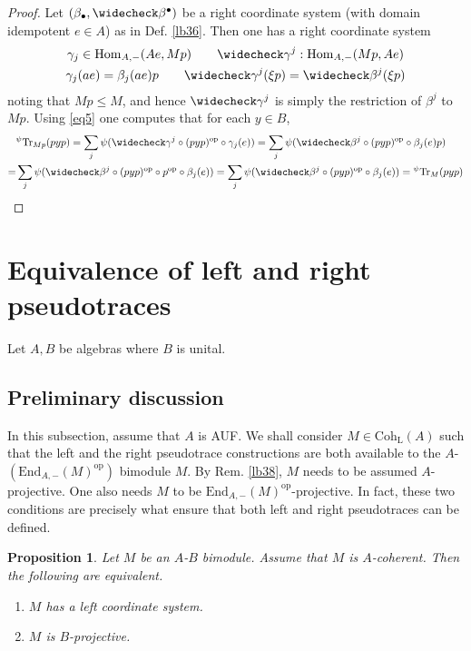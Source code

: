 \documentclass[11pt,b5paper,notitlepage]{article}
\theoremstyle{definition}
\theoremstyle{plain}
\newtheorem{pp}[df]{Proposition}
\newcommand{\wch}{\widecheck}
\newcommand{\Tr}{\mathrm{Tr}}
\newcommand{\End}{\mathrm{End}} %
\newcommand{\Hom}{\mathrm{Hom}}
\newcommand{\opp}{\mathrm{op}}
\newcommand{\blt}{\bullet}
\newcommand{\Coh}{\mathrm{Coh}_{\mathrm L}}
\numberwithin{equation}{section}
\begin{document}
\begin{proof}
Let $(\beta_\blt,\wch\beta^\blt)$ be a right coordinate system (with domain idempotent $e\in A$) as in Def. \ref{lb36}. Then one has a right coordinate system
\begin{gather*}
\gamma_j\in\Hom_{A,-}(Ae,Mp)\qquad \wch\gamma^j:\Hom_{A,-}(Mp,Ae)\\
\gamma_j(ae)=\beta_j(ae)p\qquad \wch\gamma^j(\xi p)=\wch\beta^j(\xi p)
\end{gather*}
noting that $Mp\leq M$, and hence $\wch\gamma^j$ is simply the restriction of $\beta^j$ to $Mp$. Using \eqref{eq5} one computes that for each $y\in B$,
\begin{align*}
&{}^\psi\Tr_{Mp}(pyp)=\sum_j \psi(\wch\gamma^j\circ (pyp)^\opp\circ \gamma_j(e))=\sum_j \psi(\wch\beta^j\circ (pyp)^\opp\circ \beta_j(e)p)\\
=&\sum_j \psi(\wch\beta^j\circ (pyp)^\opp\circ p^\opp\circ\beta_j(e))=\sum_j \psi(\wch\beta^j\circ (pyp)^\opp\circ\beta_j(e))={}^\psi\Tr_M(pyp)
\end{align*}
\end{proof}






\section{Equivalence of left and right pseudotraces}

Let $A,B$ be algebras where $B$ is unital. 


\subsection{Preliminary discussion}

In this subsection, assume that $A$ is AUF. We shall consider $M\in\Coh(A)$ such that the left and the right pseudotrace constructions are both available to the $A$-$(\End_{A,-}(M)^\opp)$ bimodule $M$. By Rem. \ref{lb38}, $M$ needs to be assumed  $A$-projective. One also needs $M$ to be $\End_{A,-}(M)^\opp$-projective. In fact, these two conditions are precisely what ensure that both left and right pseudotraces can be defined.

\begin{pp}
Let $M$ be an $A$-$B$ bimodule. Assume that $M$ is $A$-coherent. Then the following are equivalent.
\begin{enumerate}[label=(\arabic*)]
\item $M$ has a left coordinate system.
\item $M$ is $B$-projective.
\end{enumerate}
\end{pp}
\end{document}
